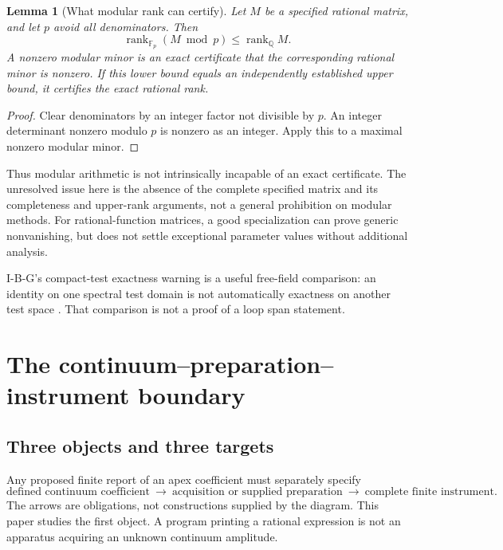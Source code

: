 \documentclass[11pt,a4paper]{article}
\newcommand{\rank}{\operatorname{rank}}
\newcommand{\loc}[1]{\nolinkurl{#1}}
\theoremstyle{plain}
\newtheorem{lemma}[theorem]{Lemma}
\theoremstyle{definition}
\theoremstyle{remark}
\numberwithin{equation}{section}
\begin{document}
\begin{lemma}[What modular rank can certify]
\label{lem:modular}
Let \(M\) be a specified rational matrix, and let \(p\) avoid all
denominators. Then
\[
 \rank_{\mathbb F_p}(M\bmod p)\le\rank_{\mathbb Q}M.
\]
A nonzero modular minor is an exact certificate that the
corresponding rational minor is nonzero.
If this lower bound equals an independently established upper
bound, it certifies the exact rational rank.
\end{lemma}

\begin{proof}
Clear denominators by an integer factor not divisible by \(p\).
An integer determinant nonzero modulo \(p\) is nonzero as an
integer. Apply this to a maximal nonzero modular minor.
\end{proof}

Thus modular arithmetic is not intrinsically incapable of an
exact certificate. The unresolved issue here is the absence of
the complete specified matrix and its completeness and upper-rank
arguments, not a general prohibition on modular methods.
For rational-function matrices, a good specialization can prove
generic nonvanishing, but does not settle exceptional parameter
values without additional analysis.

I-B-G's compact-test exactness warning is a useful free-field
comparison: an identity on one spectral test domain is not
automatically exactness on another test space
\cite[\loc{rem:compact-exact}]{CheungIBG}.
That comparison is not a proof of a loop span statement.

\section{The continuum--preparation--instrument boundary}
\label{sec:readout}

\subsection{Three objects and three targets}

Any proposed finite report of an apex coefficient must separately
specify
\begin{equation}
 \boxed{\text{defined continuum coefficient}}
 \ \longrightarrow\
 \boxed{\text{acquisition or supplied preparation}}
 \ \longrightarrow\
 \boxed{\text{complete finite instrument}}.
 \label{eq:pipeline}
\end{equation}
The arrows are obligations, not constructions supplied by the
diagram. This paper studies the first object.
A program printing a rational expression is not an apparatus
acquiring an unknown continuum amplitude.
\end{document}
